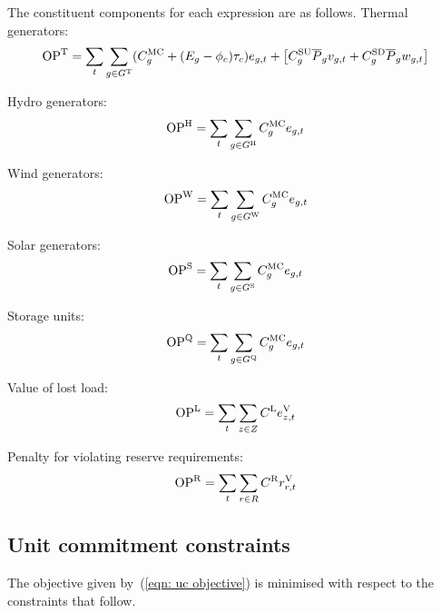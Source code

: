 \documentclass{article}
\begin{document}
The constituent components for each expression are as follows. Thermal generators:
\begin{equation}
\cOperatingCostThermal = \sum\limits_{\iInterval} \sum\limits_{\iGenerator \in \sGeneratorsThermal} (\cMarginalCost + (\cEmissionsIntensity - \vBaseline)\vPermitPrice)\vEnergy + \left[\cStartupCost \cPowerOutputMax \vStartupIndicator + \cShutdownCost \cPowerOutputMax \vShutdownIndicator\right]
\label{eqn: total thermal generator operating cost}
\end{equation}

Hydro generators:
\begin{equation}
\cOperatingCostHydro = \sum\limits_{\iInterval}\sum\limits_{\iGenerator \in \sGeneratorsHydro}\cMarginalCost[\iGenerator] \vEnergy
\end{equation}

Wind generators:
\begin{equation}
\cOperatingCostWind = \sum\limits_{\iInterval}\sum\limits_{\iGenerator \in \sGeneratorsWind} \cMarginalCost[\iGenerator] \vEnergy
\end{equation}

Solar generators:
\begin{equation}
\cOperatingCostSolar = \sum\limits_{\iInterval}\sum\limits_{\iGenerator \in \sGeneratorsSolar} \cMarginalCost[\iGenerator] \vEnergy
\end{equation}

Storage units:
\begin{equation}
\cOperatingCostStorage = \sum\limits_{\iInterval}\sum\limits_{\iGenerator \in \sStorage} \cMarginalCost[\iGenerator] \vEnergy
\end{equation}

Value of lost load:
\begin{equation}
\cOperatingCostLostLoad = \sum\limits_{\iInterval}\sum\limits_{\iZone \in \sZones} \cLostLoadCost \vLostLoadEnergy
\end{equation}

Penalty for violating reserve requirements:
\begin{equation}
\cOperatingCostReserveUpViolation = \sum\limits_{\iInterval}\sum\limits_{\iRegion \in \sRegions} \cReserveUpViolationPenalty \vReserveUpViolation
\end{equation}

\subsection{Unit commitment constraints}
The objective given by~(\ref{eqn: uc objective}) is minimised with respect to the constraints that follow.
\end{document}
